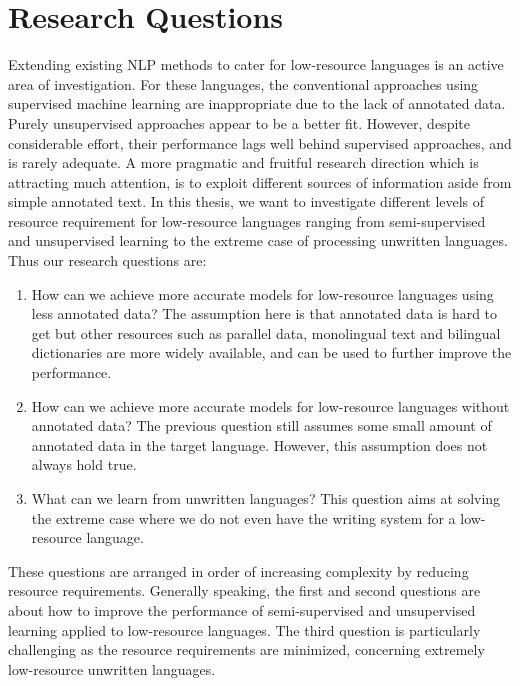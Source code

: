 \documentclass[12pt,twoside,final,hidelinks]{ltthesis}
\theoremstyle{definition}
\begin{document}
\section{Research Questions}
Extending existing NLP methods to cater for low-resource languages is an active area of investigation. For these languages, the conventional approaches using supervised machine learning are inappropriate due to the lack of annotated data. Purely unsupervised approaches appear to be a better fit. However, despite considerable effort, their performance lags well behind supervised approaches, and is rarely adequate. A more pragmatic and fruitful research direction which is attracting much attention, is to exploit different sources of information aside from simple annotated text. In this thesis, we want to investigate different levels of resource requirement for low-resource languages ranging from semi-supervised and unsupervised learning to the extreme case of processing unwritten languages. Thus our research questions are: 
\begin{enumerate}
\item How can we achieve more accurate models for low-resource languages using less annotated data? The assumption here is that annotated data is hard to get but other resources such as parallel data, monolingual text and bilingual dictionaries are more widely available, and can be used to further improve the performance.
\item How can we achieve more accurate models for low-resource languages without annotated data? The previous question still assumes some small amount of annotated data in the target language. However, this assumption does not always hold true.
\item What can we learn from unwritten languages? This question aims at solving the extreme case where we do not even have the writing system for a low-resource language.  
\end{enumerate}
These questions are arranged in order of increasing complexity by reducing resource requirements. Generally speaking, the first and second questions are about how to improve
the performance of semi-supervised and unsupervised learning applied to low-resource languages. The third question is particularly challenging as the resource requirements are minimized, concerning extremely low-resource unwritten languages. 
\end{document}
